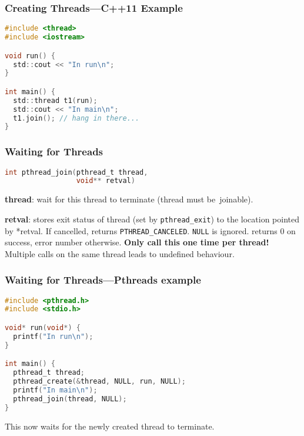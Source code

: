 \begin{frame}[fragile]
  \frametitle{Creating Threads---C++11 Example}


\begin{lstlisting}[language=C]
#include <thread>
#include <iostream>

void run() {
  std::cout << "In run\n";
}

int main() {
  std::thread t1(run);
  std::cout << "In main\n";
  t1.join(); // hang in there...
}
\end{lstlisting}

\end{frame}


\begin{frame}[fragile]
  \frametitle{Waiting for Threads}


  \begin{lstlisting}[language=C]
int pthread_join(pthread_t thread,
                 void** retval)
  \end{lstlisting}
  \vfill
  {\bf thread}: wait for this thread to terminate (thread must be~joinable).

  {\bf retval}: stores exit status of thread (set by {\tt pthread\_exit}) to
                 the location pointed by *retval. If cancelled, returns
                 {\tt PTHREAD\_CANCELED}. {\tt NULL} is ignored.
  \vfill
  returns 0 on success, error number otherwise.
  \vfill
  {\bf Only call this one time per thread!} Multiple calls on the same thread
  leads to undefined behaviour.

\end{frame}

\begin{frame}[fragile]
  \frametitle{Waiting for Threads---Pthreads example}


\begin{lstlisting}[language=C]
#include <pthread.h>
#include <stdio.h>

void* run(void*) {
  printf("In run\n");
}

int main() {
  pthread_t thread;
  pthread_create(&thread, NULL, run, NULL);
  printf("In main\n");
  pthread_join(thread, NULL);
}
\end{lstlisting}
  \vfill
  This now waits for the newly created thread to terminate.

\end{frame}

